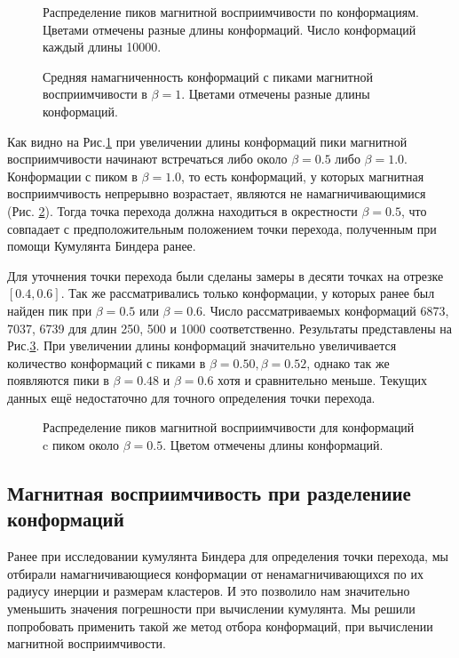 \begin{figure}[htb]
	\centering
	
	\caption{Распределение пиков магнитной восприимчивости по конформациям. Цветами отмечены разные длины конформаций. Число конформаций каждый длины 10000. }
	\label{fig:ms_peaks}
\end{figure}


\begin{figure}[hbt]
	\centering
	
	\caption{Средняя намагниченность конформаций с пиками магнитной восприимчивости в $\beta = 1$. Цветами отмечены разные длины конформаций.}
	\label{fig:no_peaks_mag2}
\end{figure}


Как видно на Рис.\ref{fig:ms_peaks} при увеличении длины конформаций пики магнитной восприимчивости начинают встречаться либо около $\beta = 0.5$ либо $\beta = 1.0$. Конформации с пиком в $\beta = 1.0$, то есть конформаций, у которых магнитная восприимчивость непрерывно возрастает, являются не намагничивающимися (Рис. \ref{fig:no_peaks_mag2}). Тогда точка перехода должна находиться в окрестности $\beta = 0.5$, что совпадает с предположительным положением точки перехода, полученным при помощи Кумулянта Биндера \cite{binder_cumulant} ранее.


Для уточнения точки перехода были сделаны замеры в десяти точках на отрезке $[0.4, 0.6]$. Так же рассматривались только конформации, у которых ранее был найден пик при $\beta=0.5$ или $\beta=0.6$. Число рассматриваемых конформаций 6873, 7037, 6739 для длин 250, 500 и 1000 соответственно. Результаты представлены на Рис.\ref{fig:ms_peaks_close}. При увеличении длины конформаций значительно увеличивается количество конформаций с пиками в $\beta = 0.50, \beta = 0.52$, однако так же появляются пики в $\beta = 0.48$ и $ \beta = 0.6$ хотя и сравнительно меньше. Текущих данных ещё недостаточно для точного определения точки перехода.


\begin{figure}[ht]
	\centering
	
	\caption{Распределение пиков магнитной восприимчивости для конформаций c пиком около $\beta = 0.5$. Цветом отмечены длины конформаций.}
	\label{fig:ms_peaks_close}
\end{figure}


\subsection{Магнитная восприимчивость при разделениие конформаций}
Ранее при исследовании кумулянта Биндера для определения точки перехода, мы отбирали намагничивающиеся конформации от ненамагничивающихся по их радиусу инерции и размерам кластеров. И это позволило нам значительно уменьшить значения погрешности при вычислении кумулянта. Мы решили попробовать применить такой же метод отбора конформаций, при вычислении магнитной восприимчивости.


